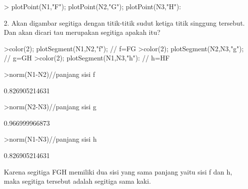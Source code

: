 \documentclass[12pt,arial,letterpaper]{book}
\begin{document}
\begin{eulercomment}
\begin{eulercomment}
\begin{eulercomment}
\begin{eulercomment}
\begin{eulercomment}
\begin{eulercomment}
\begin{eulercomment}
\begin{eulercomment}
\begin{eulercomment}
\begin{eulercomment}
\begin{eulercomment}
\begin{eulercomment}
\begin{eulercomment}
\begin{eulercomment}
\begin{eulercomment}
\begin{eulercomment}
\begin{eulercomment}
\begin{eulercomment}
\begin{eulercomment}
\begin{eulercomment}
\begin{eulercomment}
\begin{eulercomment}
\begin{eulercomment}
\begin{eulercomment}
\begin{eulerprompt}
> plotPoint(N1,"F"); plotPoint(N2,"G"); plotPoint(N3,"H"):
\end{eulerprompt}
\begin{eulercomment}
2. Akan digambar segitiga dengan titik-titik sudut ketiga titik
singgung tersebut. Dan akan dicari tau merupakan segitiga apakah itu?
\end{eulercomment}
\begin{eulerprompt}
>color(2); plotSegment(N1,N2,"f"); // f=FG
>color(2); plotSegment(N2,N3,"g"); // g=GH
>color(2); plotSegment(N1,N3,"h"): // h=HF
\end{eulerprompt}
\begin{eulerprompt}
>norm(N1-N2)//panjang sisi f
\end{eulerprompt}
\begin{euleroutput}
  0.826905214631
\end{euleroutput}
\begin{eulerprompt}
>norm(N2-N3)//panjang sisi g
\end{eulerprompt}
\begin{euleroutput}
  0.966999966873
\end{euleroutput}
\begin{eulerprompt}
>norm(N1-N3)//panjang sisi h
\end{eulerprompt}
\begin{euleroutput}
  0.826905214631
\end{euleroutput}
\begin{eulercomment}
Karena segitiga FGH memiliki dua sisi yang sama panjang yaitu sisi f
dan h, maka segitiga tersebut adalah segitiga sama kaki.


\end{eulercomment}
\end{eulercomment}
\end{eulercomment}
\end{eulercomment}
\end{eulercomment}
\end{eulercomment}
\end{eulercomment}
\end{eulercomment}
\end{eulercomment}
\end{eulercomment}
\end{eulercomment}
\end{eulercomment}
\end{eulercomment}
\end{eulercomment}
\end{eulercomment}
\end{eulercomment}
\end{eulercomment}
\end{eulercomment}
\end{eulercomment}
\end{eulercomment}
\end{eulercomment}
\end{eulercomment}
\end{eulercomment}
\end{eulercomment}
\end{eulercomment}
\end{document}
